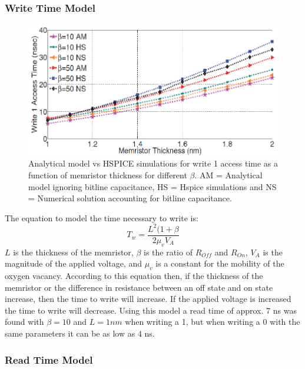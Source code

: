 \documentclass{sig-alternate}
\begin{document}
\subsubsection{Write Time Model}
\begin{figure}
  \includegraphics[scale=.35]{writeTime.png}
  \caption{Analytical model vs HSPICE simulations for write 1
access time as a function of memristor thickness for different
$\beta$. AM = Analytical model ignoring bitline capacitance,
HS = Hspice simulations and NS = Numerical solution
accounting for bitline capacitance.}
  \label{fig:writeTime}
\end{figure}
The equation to model the time necessary to write is:
\begin{equation*}
T_{w} = \frac{L^2 (1 + \beta}{2 \mu _{v} V_{A}}
\end{equation*}
$L$ is the thickness of the memristor, $\beta$ is the ratio of $R_{Off}$ and $R_{On}$, $V_{A}$ is the magnitude of the applied voltage, and $\mu _{v}$ is a constant for the mobility of the oxygen vacancy.  According to this equation then, if the thickness of the memristor or the difference in resistance between an off state and on state increase, then the time to write will increase.  If the applied voltage is increased the time to write will decrease.  Using this model a read time of approx. 7 ns was found with $\beta = 10$ and $L = 1 nm$ when writing a 1, but when writing a 0 with the same parameters it can be as low as 4 ns.

\subsubsection{Read Time Model}
\end{document}
